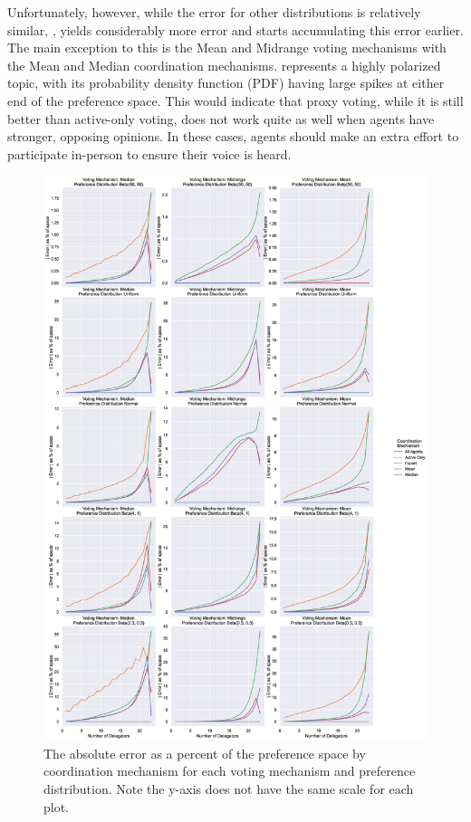 Unfortunately, however, while the error for other distributions is relatively similar,
, yields considerably more error and starts accumulating
this error earlier.
The main exception to this is the Mean and Midrange voting mechanisms with the Mean
and Median coordination mechanisms.
 represents a highly polarized topic, with its probability
density function (PDF) having large spikes at either end of the preference space.
This would indicate that proxy voting, while it is still better than active-only
voting, does not work quite as well when agents have stronger, opposing opinions.
In these cases, agents should make an extra effort to participate in-person to ensure
their voice is heard.

\begin{figure}[p]
    \centering
    \includegraphics[scale=0.30]
    {content/chapter2/figures/distribution_different_scale_error_as_percent_of_space_abs_mean}
    \caption{
        The absolute error as a percent of the preference space by coordination
        mechanism for each voting mechanism and preference distribution.
        Note the y-axis does not have the same scale for each plot.
    }
    \label{fig:distribution-different-scale-error-as-percent-of-space-abs-mean}
\end{figure}

